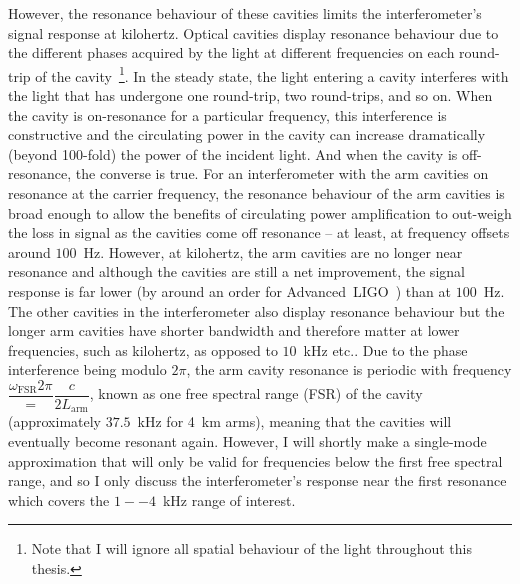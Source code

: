 However, the resonance behaviour of these cavities limits the interferometer's signal response at kilohertz. Optical cavities display resonance behaviour due to the different phases acquired by the light at different frequencies on each round-trip of the cavity~\footnote{Note that I will ignore all spatial behaviour of the light throughout this thesis.}. In the steady state, the light entering a cavity interferes with the light that has undergone one round-trip, two round-trips, and so on. When the cavity is on-resonance for a particular frequency, this interference is constructive and the circulating power in the cavity can increase dramatically (beyond 100-fold) the power of the incident light. And when the cavity is off-resonance, the converse is true. 
For an interferometer with the arm cavities on resonance at the carrier frequency, the resonance behaviour of the arm cavities is broad enough to allow the benefits of circulating power amplification to out-weigh the loss in signal as the cavities come off resonance -- at least, at frequency offsets around $100$~Hz. However, at kilohertz, the arm cavities are no longer near resonance and although the cavities are still a net improvement, the signal response is far lower (by around an order for Advanced~LIGO~\cite{}) than at $100$~Hz. The other cavities in the interferometer also display resonance behaviour but the longer arm cavities have shorter bandwidth and therefore matter at lower frequencies, such as kilohertz, as opposed to $10$~kHz etc.. 
Due to the phase interference being modulo $2\pi$, the arm cavity resonance is periodic with frequency $\dfrac{\omega_\text{FSR}{2\pi}}=\dfrac{c}{2L_\text{arm}}$, known as one free spectral range (FSR) of the cavity (approximately $37.5$~kHz for 4~km arms), meaning that the cavities will eventually become resonant again. However, I will shortly make a single-mode approximation that will only be valid for frequencies below the first free spectral range, and so I only discuss the interferometer's response near the first resonance which covers the $1--4$~kHz range of interest.

